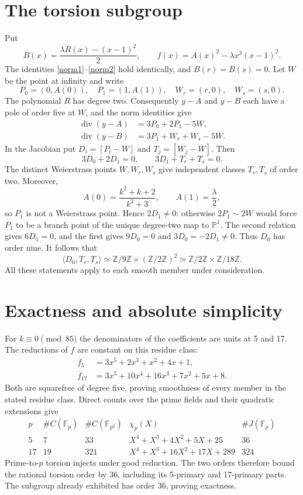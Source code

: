 \documentclass[11pt]{article}
\newcommand{\F}{\mathbb F}
\newcommand{\Z}{\mathbb Z}
\newcommand{\divi}{\operatorname{div}}
\begin{document}
\section{The torsion subgroup}
Put
\[
 B(x)=\frac{\lambda R(x)-(x-1)^2}{2},\qquad
 f(x)=A(x)^2-\lambda x^3(x-1)^2.
\]
The identities \eqref{norm1}--\eqref{norm2} hold identically, and
$B(r)=B(s)=0$. Let $W$ be the point at infinity and write
\[
 P_0=(0,A(0)),\quad P_1=(1,A(1)),\quad
 W_r=(r,0),\quad W_s=(s,0).
\]
The polynomial $R$ has degree two. Consequently $y-A$ and $y-B$
each have a pole of order five at $W$, and the norm identities give
\begin{align*}
 \divi(y-A)&=3P_0+2P_1-5W,\\
 \divi(y-B)&=3P_1+W_r+W_s-5W.
\end{align*}
In the Jacobian put $D_i=[P_i-W]$ and $T_j=[W_j-W]$. Then
\begin{equation}\label{relations}
 3D_0+2D_1=0,\qquad 3D_1+T_r+T_s=0.
\end{equation}
The distinct Weierstrass points $W,W_r,W_s$ give independent
classes $T_r,T_s$ of order two. Moreover,
\[
 A(0)=\frac{k^2+k+2}{k^2+3},\qquad A(1)=\frac\lambda2,
\]
so $P_1$ is not a Weierstrass point. Hence $2D_1\ne0$: otherwise
$2P_1\sim2W$ would force $P_1$ to be a branch point of the
unique degree-two map to $\mathbb P^1$.
The second relation gives $6D_1=0$, and the first gives
$9D_0=0$ and $3D_0=-2D_1\ne0$. Thus $D_0$ has order nine.
It follows that
\[
 \langle D_0,T_r,T_s\rangle
 \simeq\Z/9\Z\times(\Z/2\Z)^2
 \simeq\Z/2\Z\times\Z/18\Z.
\]
All these statements apply to each smooth member under consideration.

\section{Exactness and absolute simplicity}
For $k\equiv0\pmod {85}$ the denominators of the coefficients are
units at 5 and 17. The reductions of $f$ are constant on this
residue class:
\begin{align*}
 \overline f_5&=3x^5+2x^3+x^2+4x+1,\\
 \overline f_{17}&=3x^5+10x^4+16x^3+7x^2+5x+8.
\end{align*}
Both are squarefree of degree five, proving smoothness of every
member in the stated residue class. Direct counts over the prime
fields and their quadratic extensions give
\[
\begin{array}{c|rr|l|r}
 p&\#C(\F_p)&\#C(\F_{p^2})&\chi_p(X)&\#J(\F_p)\\\hline
 5&7&33&X^4+X^3+4X^2+5X+25&36\\
 17&19&321&X^4+X^3+16X^2+17X+289&324
\end{array}
\]
Prime-to-$p$ torsion injects under good reduction. The two orders
therefore bound the rational torsion order by 36, including its
5-primary and 17-primary parts. The subgroup already exhibited
has order 36, proving exactness.
\end{document}
